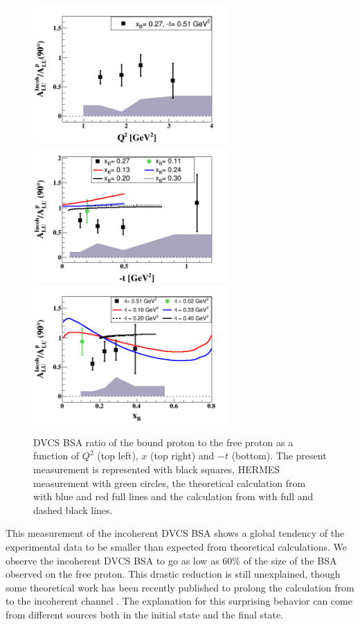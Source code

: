 \documentclass[aps,prc,preprint,superscriptaddress]{revtex4}
\begin{document}
\begin{figure}[tbp!]
\center
\includegraphics[width=7.4cm]{fig3/ALU_ratioInc_Q2_shortscenrario.png}
\includegraphics[width=7.4cm]{fig3/ALU_ratioInc_t_shortscenrario.png}
\includegraphics[width=7.4cm]{fig3/ALU_ratioInc_x_shortscenrario.png}
	\caption{DVCS BSA ratio of the bound proton to the free proton as a function of 
	$Q^2$ (top left), $x$ (top right) and $-t$ (bottom). The present measurement is 
	represented with black squares, HERMES 
	measurement \cite{Airapetian:2009cga} with green circles, the theoretical 
	calculation from \cite{Liuti:2005gi} with blue and red full lines and the
	calculation from \cite{Guzey:2008fe} with full and dashed black lines.}
\label{fig:IncRatios}
\end{figure}

This measurement of the incoherent DVCS BSA shows a global tendency of the experimental data 
to be smaller than expected from theoretical calculations. We observe the incoherent DVCS 
BSA to go as low as 60\% of the size of the BSA observed
on the free proton. This drastic reduction is still unexplained, though some theoretical 
work has been recently published to prolong the calculation from \cite{Fucini:2018gso} to the incoherent 
channel \cite{Fucini:2019xlc}. The explanation for this surprising behavior can come from different sources
both in the initial state and the final state.
\end{document}
